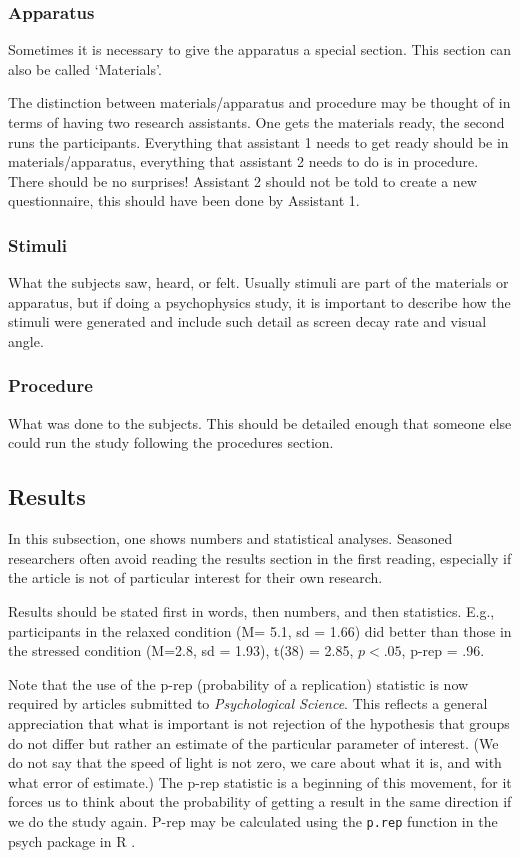 \documentclass[jou]{apa}%
\let\proglang=\textsf
\newcommand{\R}{\proglang{R}}
\newcommand{\pkg}[1]{{\normalfont\fontseries{b}\selectfont #1}}
\newcommand{\fun}[1]{{\texttt{#1}}}
\begin{document}
\subsubsection{Apparatus}
Sometimes it is necessary to give the apparatus a special section.  This section can also be called `Materials'.

The distinction between materials/apparatus and procedure may be thought of in terms of having two research assistants.  One gets the materials ready, the second runs the participants.  Everything that assistant 1 needs to get ready should be in materials/apparatus, everything that assistant  2 needs to do is in procedure.  There should be no surprises!  Assistant 2 should not be told to create a new questionnaire, this should have been done by Assistant 1. %

\subsubsection{Stimuli}
What the subjects saw, heard, or felt. %
Usually stimuli are part of the materials or apparatus, but if doing a psychophysics study, it is important to describe how the stimuli were generated and include such detail as screen decay rate and visual angle.
\subsubsection{Procedure}
What was done to the subjects.  This should be detailed enough that someone else could run the study following the procedures section. 
\subsection{Results}
In this subsection, one shows numbers and statistical analyses. Seasoned researchers often avoid reading the results section in the first reading, especially if the article is not of particular interest for their own research. %

Results should be stated first in words, then numbers, and then statistics.  E.g., participants in the relaxed condition (M= 5.1, sd = 1.66) did better than those in the stressed condition (M=2.8, sd = 1.93), t(38) = 2.85, $p< .05$, p-rep = .96.



Note that the use of the p-rep (probability of a replication) statistic \cite{killeen} is now required by articles submitted to\emph{ Psychological Science}. This reflects a general appreciation that what is important is not rejection of the hypothesis that groups do not differ but rather an estimate of the particular parameter of interest.  (We do not say that the speed of light is not zero, we care about what it is, and with what error of estimate.)  The p-rep statistic is a beginning of this movement, for it forces us to think about the probability of getting a result in the same direction if we do the study again.  P-rep may be calculated using the \fun{p.rep} function in the \pkg{psych} package \cite{psych} in \R{} \cite{R}. 
\end{document}
